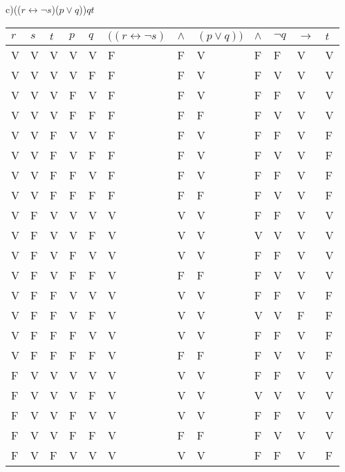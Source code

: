 \documentclass{article}
\begin{document}
\begin{flushleft}
c)(($r\leftrightarrow \neg s$)\wedge ($p \vee q$))\wedge \neg $q$\rightarrow $t$ \\
\end{flushleft}
\begin{center}
  \begin{tabular}{|o|o|o|o|o|o|o|o|o|o|o|o|}\hline
    $r$ & $s$ & $t$ & $p$ & $q$ & $((r\leftrightarrow \neg s)$ & $\wedge$ & $(p \vee q))$ & $\wedge$ & $\neg q$ & $\rightarrow$ & $t$\\ \hline
    V & V & V & V & V & F & F & V & F & F & V & V\\ \hline
    V & V & V & V & F & F & F & V & F & V & V & V\\ \hline
    V & V & V & F & V & F & F & V & F & F & V & V\\ \hline
    V & V & V & F & F & F & F & F & F & V & V & V\\ \hline
    V & V & F & V & V & F & F & V & F & F & V & F\\ \hline
    V & V & F & V & F & F & F & V & F & V & V & F\\ \hline
    V & V & F & F & V & F & F & V & F & F & V & F\\ \hline
    V & V & F & F & F & F & F & F & F & V & V & F\\ \hline
    V & F & V & V & V & V & V & V & F & F & V & V\\ \hline
    V & F & V & V & F & V & V & V & V & V & V & V\\ \hline
    V & F & V & F & V & V & V & V & F & F & V & V\\ \hline
    V & F & V & F & F & V & F & F & F & V & V & V\\ \hline
    V & F & F & V & V & V & V & V & F & F & V & F\\ \hline
    V & F & F & V & F & V & V & V & V & V & F & F\\ \hline
    V & F & F & F & V & V & V & V & F & F & V & F\\ \hline
    V & F & F & F & F & V & F & F & F & V & V & F\\ \hline
    F & V & V & V & V & V & V & V & F & F & V & V\\ \hline
    F & V & V & V & F & V & V & V & V & V & V & V\\ \hline
    F & V & V & F & V & V & V & V & F & F & V & V\\ \hline
    F & V & V & F & F & V & F & F & F & V & V & V\\ \hline
    F & V & F & V & V & V & V & V & F & F & V & F\\ \hline

\end{tabular}
\end{center}
\end{document}

